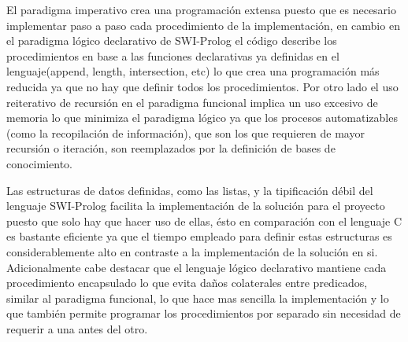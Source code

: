 \documentclass[letterpaper,12pt]{report}
\begin{document}
El paradigma imperativo crea una programación extensa puesto que es necesario implementar paso a paso cada procedimiento de la implementación, en cambio en el paradigma lógico declarativo de SWI-Prolog el código describe los procedimientos en base a las funciones declarativas ya definidas en el lenguaje(append, length, intersection, etc) lo que crea una programación más reducida ya que no hay que definir todos los procedimientos. Por otro lado el uso reiterativo de recursión en el paradigma funcional implica un uso excesivo de memoria lo que minimiza el paradigma lógico ya que los procesos automatizables (como la recopilación de información), que son los que requieren de mayor recursión o iteración, son reemplazados por la definición de bases de conocimiento.

Las estructuras de datos definidas, como las listas, y la tipificación débil del lenguaje SWI-Prolog facilita la implementación de la solución para el proyecto puesto que solo hay que hacer uso de ellas, ésto en comparación con el lenguaje C es bastante eficiente ya que el tiempo empleado para definir estas estructuras es considerablemente alto en contraste a la implementación de la solución en si. Adicionalmente cabe destacar que el lenguaje lógico declarativo mantiene cada procedimiento encapsulado lo que evita daños colaterales entre predicados, similar al paradigma funcional, lo que hace mas sencilla la implementación y lo que también permite programar los procedimientos por separado sin necesidad de requerir a una antes del otro.





\end{document}
